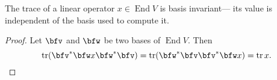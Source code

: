 \documentclass{article}
\DeclareMathOperator{\End}{End}
\DeclareMathOperator{\tr}{tr}
\begin{document}
\begin{theorem}\label{thm:TraceIsBasisIndependent}
    The trace of a linear operator $x \in \End V$ is basis invariant--- its value is independent of the basis used to compute it.
\end{theorem}

\begin{proof}
    Let $\bfv$ and $\bfw$ be two bases of $\End V$.
    Then
    \[
        \tr (\bfv^\ast\bfw x \bfw^\ast\bfv)
        =
        \tr (\bfw^\ast \bfv \bfv^\ast \bfw x)
        =
        \tr x.
    \]
\end{proof}
\end{document}
